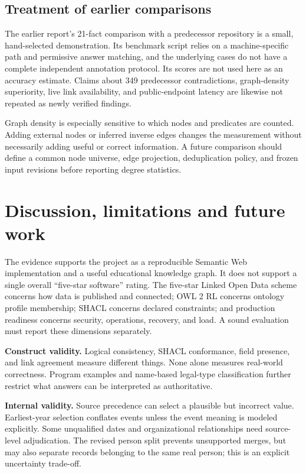 \documentclass[11pt,a4paper]{article}
\begin{document}
\subsection{Treatment of earlier comparisons}
The earlier report's 21-fact comparison with a predecessor repository is a small,
hand-selected demonstration. Its benchmark script relies on a machine-specific path and
permissive answer matching, and the underlying cases do not have a complete independent
annotation protocol. Its scores are not used here as an accuracy estimate. Claims about
349 predecessor contradictions, graph-density superiority, live link availability, and
public-endpoint latency are likewise not repeated as newly verified findings.

Graph density is especially sensitive to which nodes and predicates are counted.
Adding external nodes or inferred inverse edges changes the measurement without necessarily
adding useful or correct information. A future comparison should define a common node
universe, edge projection, deduplication policy, and frozen input revisions before reporting
degree statistics.

\section{Discussion, limitations and future work}
The evidence supports the project as a reproducible Semantic Web implementation and a useful
educational knowledge graph. It does not support a single overall ``five-star software''
rating. The five-star Linked Open Data scheme concerns how data is published and connected;
OWL 2 RL concerns ontology profile membership; SHACL concerns declared constraints; and
production readiness concerns security, operations, recovery, and load. A sound evaluation
must report these dimensions separately.

\textbf{Construct validity.} Logical consistency, SHACL conformance, field presence, and
link agreement measure different things. None alone measures real-world correctness.
Program examples and name-based legal-type classification further restrict what answers
can be interpreted as authoritative.

\textbf{Internal validity.} Source precedence can select a plausible but incorrect value.
Earliest-year selection conflates events unless the event meaning is modeled explicitly.
Some unqualified dates and organizational relationships need source-level adjudication.
The revised person split prevents unsupported merges, but may also separate records
belonging to the same real person; this is an explicit uncertainty trade-off.
\end{document}
